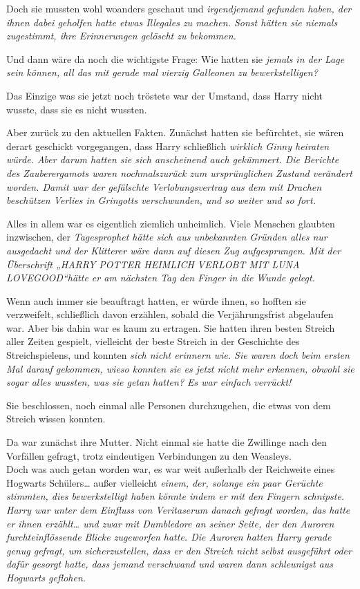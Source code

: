 {Doch sie mussten wohl woanders geschaut und \emph{\emph{irgendjemand} gefunden haben, der ihnen dabei geholfen hatte \emph{etwas} Illegales zu machen. Sonst hätten sie niemals zugestimmt, ihre Erinnerungen gelöscht zu bekommen.}

Und dann wäre da noch die wichtigste Frage: Wie hatten sie \emph{jemals in der Lage sein können, all das mit gerade mal vierzig Galleonen zu bewerkstelligen?}

Das Einzige was sie jetzt noch tröstete war der Umstand, dass Harry nicht wusste, dass sie es nicht wussten.

Aber zurück zu den aktuellen Fakten. Zunächst hatten sie befürchtet, sie wären derart geschickt vorgegangen, dass Harry schließlich \emph{wirklich Ginny heiraten würde. Aber darum hatten sie sich anscheinend auch gekümmert. Die Berichte des Zauberergamots waren nochmalszurück zum ursprünglichen Zustand verändert worden. Damit war der gefälschte Verlobungsvertrag aus dem mit Drachen beschützen Verlies in Gringotts verschwunden, und so weiter und so fort.}

Alles in allem war es eigentlich ziemlich unheimlich. Viele Menschen glaubten inzwischen, der \emph{Tagesprophet hätte sich aus unbekannten Gründen alles nur ausgedacht und der Klitterer wäre dann auf diesen Zug aufgesprungen. Mit der Überschrift „HARRY POTTER HEIMLICH VERLOBT MIT LUNA LOVEGOOD“hätte er am nächsten Tag den Finger in die Wunde gelegt.}

Wenn auch immer sie beauftragt hatten, er würde ihnen, so hofften sie verzweifelt, schließlich davon erzählen, sobald die Verjährungsfrist abgelaufen war. Aber bis dahin war es kaum zu ertragen. Sie hatten ihren besten Streich aller Zeiten gespielt, vielleicht der beste Streich in der Geschichte des Streichspielens, und konnten \emph{sich nicht erinnern wie. Sie waren doch beim ersten Mal darauf gekommen, wieso konnten sie es jetzt nicht mehr erkennen, obwohl sie sogar alles wussten, was sie getan hatten? Es war einfach verrückt!}

Sie beschlossen, noch einmal alle Personen durchzugehen, die etwas von dem Streich wissen konnten.

Da war zunächst ihre Mutter. Nicht einmal sie hatte die Zwillinge nach den Vorfällen gefragt, trotz eindeutigen Verbindungen zu den Weasleys.\\ Doch was auch getan worden war, es war weit außerhalb der Reichweite eines Hogwarts Schülers… außer vielleicht \emph{einem, der, solange ein paar Gerüchte stimmten, dies bewerkstelligt haben könnte indem er mit den Fingern schnipste. \emph{Harry} war unter dem Einfluss von Veritaserum danach gefragt worden, das hatte er ihnen erzählt… und zwar mit Dumbledore an seiner Seite, der den Auroren furchteinflössende Blicke zugeworfen hatte. Die Auroren hatten Harry gerade genug gefragt, um sicherzustellen, dass er den Streich nicht selbst ausgeführt oder dafür gesorgt hatte, dass jemand verschwand und waren dann schleunigst aus Hogwarts geflohen.}

}
